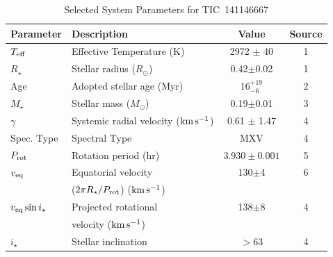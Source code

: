 \documentclass{nature3}
\newcommand{\kms}{\ensuremath{\rm km\,s^{-1}}}
\begin{document}
\begin{table}
\scriptsize
\setlength{\tabcolsep}{2pt}
\centering
\caption{Selected System Parameters for TIC~141146667}
\label{tab:params}
\begin{tabular}{llcc}
\hline \hline
Parameter & Description & Value & Source\\
\hline 
%
$T_{\rm eff}$\dotfill                   & Effective Temperature (K) \hspace{9pt}\dotfill                 & 2972 $\pm$ 40    & 1 \\
%
%
$R_\star$\dotfill                       & Stellar radius ($R_\odot$)\dotfill                             & 0.42$\pm$0.02    & 1 \\
%
Age                                     & Adopted stellar age (Myr)\dotfill                              & $16^{+19}_{-6}$  & 2 \\
%
$M_\star$\dotfill                       & Stellar mass ($M_\odot$)\dotfill                               & 0.19$\pm$0.01  & 3 \\
%
$\gamma$\dotfill                        & Systemic radial velocity (\kms)\dotfill                        & 0.61 $\pm$ 1.47  & 4 \\
%
Spec. Type\dotfill                      & Spectral Type\dotfill                                          & MXV              & 4 \\ %
%
$P_{\rm rot}$\dotfill                   & Rotation period (hr)\dotfill                                   & $3.930\pm 0.001$ & 5 \\
%
$v_{\rm eq}$\dotfill		                & Equatorial velocity \dotfill                                   &  130$\pm$4       & 6 \\
                                        & \hspace{3pt} ($2\pi R_\star/P_{\rm rot}$) (\kms)	             &                      \\
%
$v_{\rm eq}\sin{i_\star}$\dotfill		    & Projected rotational\dotfill                                   &  138$\pm$8       & 4 \\
                                        & \hspace{3pt} velocity (\kms)	                                 &                      \\
%
$i_\star$\dotfill                       & Stellar inclination\dotfill                                    & 	$>$63           & 4 \\

\end{tabular}
\end{table}
\end{document}
